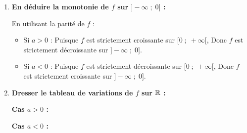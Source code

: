 \documentclass[10pt, a4paper]{article}
\begin{document}
\begin{Solution}[ACTIVITÉ][4]
\begin{enumerate}[leftmargin=*,itemsep=0.5pt]
\begin{itemize}[leftmargin=*,itemsep=0.5pt]
    \item \textbf{Deuxième cas : $a < 0$}
    
    On a :
     $\begin{cases} 
        a < 0 \\ 
        x + y > 0 
    \end{cases} \quad \text{alors} \quad a(x+y) < 0$ 
    Donc : \quad $T(x;y) < 0$

    D'où : la fonction $f$ est strictement décroissante sur $\big[0 \;;\; +\infty\big[$.
\end{itemize}

\item \textbf{En déduire la monotonie de $f$ sur $\big]-\infty \;;\; 0\big]$ :}

En utilisant la parité de $f$ :
\begin{itemize}[leftmargin=*,itemsep=0.5pt]
    \item Si $a > 0$ : Puisque $f$ est strictement croissante sur $\big[0 \;;\; +\infty\big[$,
    Donc  $f$ est strictement décroissante sur $\big]-\infty \;;\; 0\big]$.
    
    \item Si $a < 0$ : Puisque $f$ est strictement décroissante sur $\big[0 \;;\; +\infty\big[$,
    Donc  $f$ est strictement croissante sur $\big]-\infty \;;\; 0\big]$.
\end{itemize}

\item \textbf{Dresser le tableau de variations de $f$ sur $\mathbb{R}$ :}

\begin{minipage}{0.48\linewidth}
    \textbf{Cas $a > 0$ :} \\[5pt]
\end{minipage}
\hfill
\begin{minipage}{0.48\linewidth}
    \textbf{Cas $a < 0$ :} \\[5pt]
\end{minipage}


\end{enumerate}
\end{Solution}
\end{document}
